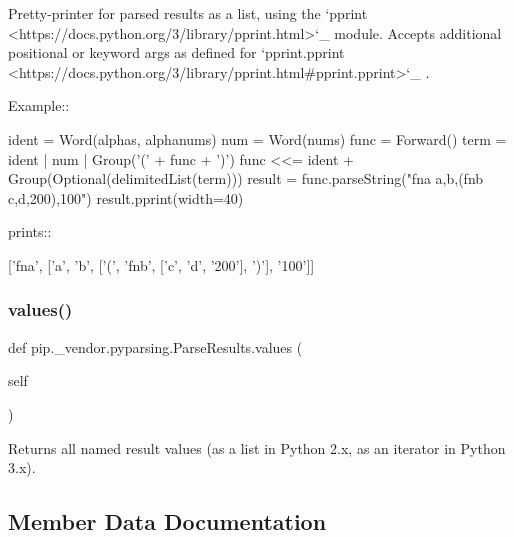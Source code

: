 \begin{DoxyVerb}Pretty-printer for parsed results as a list, using the
`pprint <https://docs.python.org/3/library/pprint.html>`_ module.
Accepts additional positional or keyword args as defined for
`pprint.pprint <https://docs.python.org/3/library/pprint.html#pprint.pprint>`_ .

Example::

    ident = Word(alphas, alphanums)
    num = Word(nums)
    func = Forward()
    term = ident | num | Group('(' + func + ')')
    func <<= ident + Group(Optional(delimitedList(term)))
    result = func.parseString("fna a,b,(fnb c,d,200),100")
    result.pprint(width=40)

prints::

    ['fna',
     ['a',
      'b',
      ['(', 'fnb', ['c', 'd', '200'], ')'],
      '100']]
\end{DoxyVerb}
 \mbox{\label{classpip_1_1__vendor_1_1pyparsing_1_1ParseResults_aadf8bd3b43b8adad0b8aa9f4a4ea1041}} 
\subsubsection{\texorpdfstring{values()}{values()}}
{\footnotesize\ttfamily def pip.\+\_\+vendor.\+pyparsing.\+Parse\+Results.\+values (\begin{DoxyParamCaption}\item[{}]{self }\end{DoxyParamCaption})}

\begin{DoxyVerb}Returns all named result values (as a list in Python 2.x, as an iterator in Python 3.x).\end{DoxyVerb}
 

\subsection{Member Data Documentation}
\mbox{\label{classpip_1_1__vendor_1_1pyparsing_1_1ParseResults_ac28f1f7cdb9004e10087bef39b32d25d}} 
